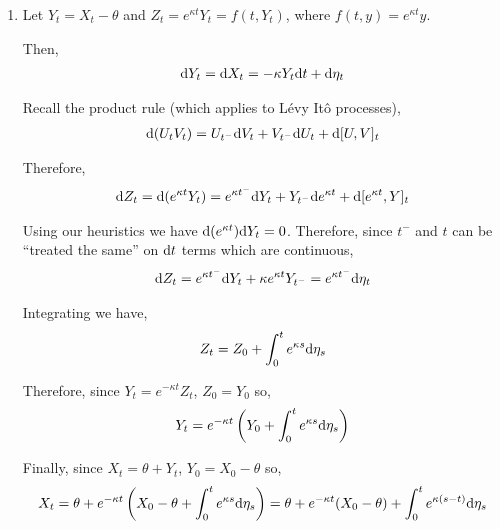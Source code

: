 \begin{solution}[Solution]
\begin{enumerate}[label=(\alph*)]
    \item 
        Let \( Y_t = X_t - \theta \) and \( Z_t = e^{\kappa t}Y_t = f(t,Y_t)  \), where \( f(t,y) = e^{\kappa t}y \).

        Then,
        \begin{align*}
            \mathrm{d} Y_t = \mathrm{d} X_t = -\kappa Y_t \mathrm{d} t + \mathrm{d} \eta_t
        \end{align*}

        Recall the product rule (which applies to L\'evy It\^o processes),
        \begin{align*}
            \mathrm{d}(U_tV_t) = U_{t^-}\mathrm{d} V_t + V_{t^-}\mathrm{d} U_t + \mathrm{d}[U,V]_t
        \end{align*}
        

        Therefore,
        \begin{align*}
            \mathrm{d} Z_t 
            = \mathrm{d} (e^{\kappa t} Y_t) 
            = e^{\kappa t^-}\mathrm{d} Y_t + Y_{t^-} \mathrm{d} e^{\kappa t} + \mathrm{d}[e^{\kappa t},Y]_t 
        \end{align*}
      


        Using our heuristics we have \( \mathrm{d} (e^{\kappa t}) \mathrm{d} Y_t = 0 \). Therefore, since \( t^- \) and \( t \) can be ``treated the same'' on \( \mathrm{d} t \) terms which are continuous,
        \begin{align*}
            \mathrm{d} Z_t = e^{\kappa t^-} \mathrm{d} Y_t + \kappa e^{\kappa t} Y_{t^-} 
            = e^{\kappa t^-} \mathrm{d} \eta_t
        \end{align*}
        
        Integrating we have,
        \begin{align*}
            Z_t = Z_0 + \int_{0}^{t} e^{\kappa s} \mathrm{d} \eta_s
        \end{align*}

        Therefore, since \( Y_t = e^{-\kappa t}Z_t \), \( Z_0 = Y_0 \) so,
        \begin{align*}
            Y_t 
            = e^{-\kappa t} \left( Y_0 + \int_{0}^{t} e^{\kappa s} \mathrm{d} \eta_s \right)
        \end{align*}
        
        Finally, since \( X_t = \theta + Y_t \), \( Y_0 = X_0 - \theta \) so,
        \begin{align*}
            X_t = \theta + e^{-\kappa t} \left( X_0 - \theta + \int_{0}^{t} e^{\kappa s} \mathrm{d} \eta_s \right)
            = \theta + e^{-\kappa t}(X_0 - \theta) + \int_{0}^{t} e^{\kappa(s-t)} \mathrm{d} \eta_s
        \end{align*}
        

\end{enumerate}
\end{solution}
